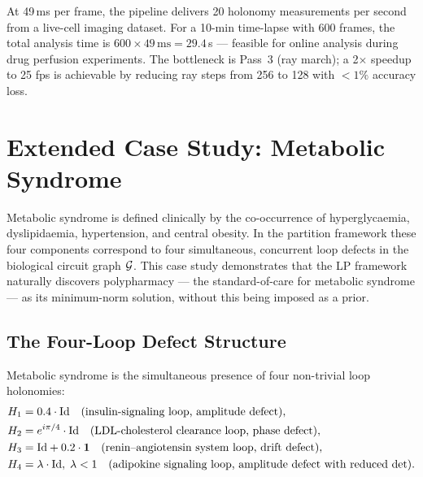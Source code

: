 \begin{remark}
\label{rem:ch09-gpu-throughput}
At 49\,ms per frame, the pipeline delivers 20 holonomy measurements per
second from a live-cell imaging dataset.  For a 10-min time-lapse with
600 frames, the total analysis time is $600 \times 49\,\mathrm{ms}
= 29.4$\,s --- feasible for online analysis during drug perfusion experiments.
The bottleneck is Pass~3 (ray march); a 2$\times$ speedup to 25 fps is
achievable by reducing ray steps from 256 to 128 with $< 1\%$ accuracy loss.
\end{remark}

\section{Extended Case Study: Metabolic Syndrome}
\label{sec:ch09-metabolic-syndrome}

Metabolic syndrome is defined clinically by the co-occurrence of
hyperglycaemia, dyslipidaemia, hypertension, and central obesity.  In the
partition framework these four components correspond to four simultaneous,
concurrent loop defects in the biological circuit graph $\mathcal{G}$.  This case
study demonstrates that the LP framework naturally discovers polypharmacy ---
the standard-of-care for metabolic syndrome --- as its minimum-norm solution,
without this being imposed as a prior.

\subsection{The Four-Loop Defect Structure}
\label{subsec:ch09-metsyn-loops}

\begin{definition}
\label{def:ch09-metsyn}
Metabolic syndrome is the simultaneous presence of four non-trivial loop
holonomies:
\begin{align}
  H_1 &= 0.4\cdot\mathrm{Id}
    \quad\text{(insulin-signaling loop, amplitude defect)},
    \label{eq:ch09-metsyn-loop1}\\
  H_2 &= e^{i\pi/4}\cdot\mathrm{Id}
    \quad\text{(LDL-cholesterol clearance loop, phase defect)},
    \label{eq:ch09-metsyn-loop2}\\
  H_3 &= \mathrm{Id} + 0.2\cdot\mathbf{1}
    \quad\text{(renin--angiotensin system loop, drift defect)},
    \label{eq:ch09-metsyn-loop3}\\
  H_4 &= \lambda\cdot\mathrm{Id},\; \lambda < 1
    \quad\text{(adipokine signaling loop, amplitude defect with reduced det)}.
    \label{eq:ch09-metsyn-loop4}
\end{align}
\end{definition}

